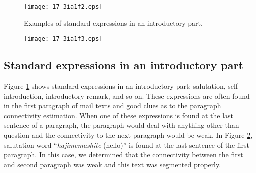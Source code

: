 \documentclass[english]{jnlp_1.4}
\begin{document}
\begin{figure}[b]
\begin{center}
\texttt{[image: 17-3ia1f2.eps]}
\end{center}
 \caption{Examples of standard expressions in an introductory part.}
 \label{fig:Examples of standard expressions in an introductory part}
\end{figure}
\begin{figure}[b]
\begin{center}
\texttt{[image: 17-3ia1f3.eps]}
\end{center}
\label{fig:a weak connectivity case:salution word}
\end{figure}

\subsection{Standard expressions in an introductory part}
\label{subsec:Standard expressions in an introductory part}

Figure \ref{fig:Examples of standard expressions in an introductory part} shows 
standard expressions in an introductory part: 
salutation, self-introduction, introductory remark, and so on.
These expressions are often found in the first paragraph of mail texts and
good clues as to the paragraph connectivity estimation.
When one of these expressions is found at the last sentence of a paragraph, 
the paragraph would deal with anything other than question
and the connectivity to the next paragraph would be weak.
In Figure \ref{fig:a weak connectivity case:salution word}, 
salutation word ``\textit{hajimemashite} (hello)'' is found 
at the last sentence of the first paragraph.
In this case, 
we determined that 
the connectivity between the first and second paragraph was weak and 
this text was segmented properly.
\end{document}
